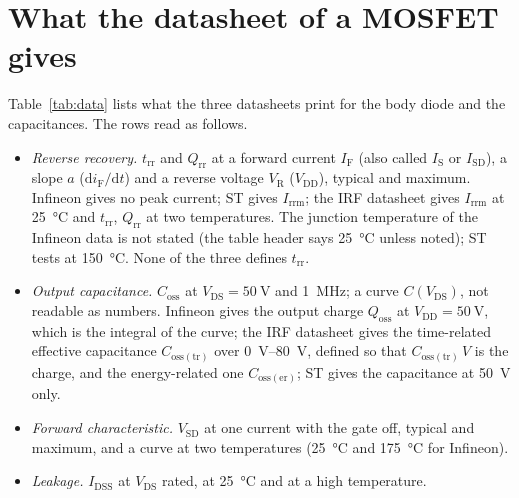 \documentclass[10pt,a4paper]{scrartcl}
\newcommand{\IF}{I_\mathrm{F}}
\newcommand{\VR}{V_\mathrm{R}}
\newcommand{\Irrm}{I_\mathrm{rrm}}
\newcommand{\Qrr}{Q_\mathrm{rr}}
\newcommand{\Qoss}{Q_\mathrm{oss}}
\newcommand{\Coss}{C_\mathrm{oss}}
\newcommand{\trr}{t_\mathrm{rr}}
\newcommand{\VSD}{V_\mathrm{SD}}
\newcommand{\VDS}{V_\mathrm{DS}}
\newcommand{\diff}{\mathrm{d}}
\begin{document}
\section{What the datasheet of a MOSFET gives}
\label{sec:datasheet}
Table~\ref{tab:data} lists what the three datasheets print for the body diode and the capacitances. The rows read as follows.
\begin{itemize}
\item \emph{Reverse recovery.} $\trr$ and $\Qrr$ at a forward current $\IF$ (also called $I_\mathrm{S}$ or $I_\mathrm{SD}$), a slope $a$ ($\diff i_\mathrm{F}/\diff t$) and a reverse voltage $\VR$ ($V_\mathrm{DD}$), typical and maximum. Infineon gives no peak current; ST gives $\Irrm$; the IRF datasheet gives $\Irrm$ at \SI{25}{\celsius} and $\trr$, $\Qrr$ at two temperatures. The junction temperature of the Infineon data is not stated (the table header says \SI{25}{\celsius} unless noted); ST tests at \SI{150}{\celsius}. None of the three defines $\trr$.
\item \emph{Output capacitance.} $\Coss$ at $\VDS = \SI{50}{\volt}$ and \SI{1}{\mega\hertz}; a curve $C(\VDS)$, not readable as numbers. Infineon gives the output charge $\Qoss$ at $V_\mathrm{DD} = \SI{50}{\volt}$, which is the integral of the curve; the IRF datasheet gives the time-related effective capacitance $C_\mathrm{oss(tr)}$ over \SIrange{0}{80}{\volt}, defined so that $C_\mathrm{oss(tr)}\,V$ is the charge, and the energy-related one $C_\mathrm{oss(er)}$; ST gives the capacitance at \SI{50}{\volt} only.
\item \emph{Forward characteristic.} $\VSD$ at one current with the gate off, typical and maximum, and a curve at two temperatures (\SI{25}{\celsius} and \SI{175}{\celsius} for Infineon).
\item \emph{Leakage.} $I_\mathrm{DSS}$ at $\VDS$ rated, at \SI{25}{\celsius} and at a high temperature.
\end{itemize}
\end{document}
